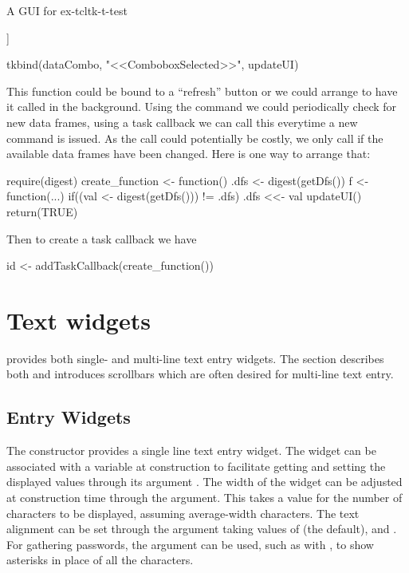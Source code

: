 \begin{example}{A GUI for }{ex-tcltk-t-test}
\begin{Schunk}
\begin{Soutput}
[[4]]
\end{Soutput}
\begin{Sinput}
 tkbind(dataCombo, "<<ComboboxSelected>>", updateUI)
\end{Sinput}
\end{Schunk}

This function could be bound to a ``refresh'' button or we could
arrange to have it called in the background. Using the 
command we could periodically check for new data frames, using a task
callback we can call this everytime a new command is issued.  As the
call could potentially be costly, we only call if the available data
frames have been changed. Here is one way to arrange that:
\begin{Schunk}
\begin{Sinput}
 require(digest)
 create_function <- function() {
   .dfs <- digest(getDfs())
   f <- function(...) {
     if((val <- digest(getDfs())) != .dfs) {
       .dfs <<- val
       updateUI()
     }
     return(TRUE)
   }
 }
\end{Sinput}
\end{Schunk}
Then to create a task callback we have
\begin{Schunk}
\begin{Sinput}
 id <- addTaskCallback(create_function())
\end{Sinput}
\end{Schunk}


\end{example}


\section{Text widgets}
\label{sec:tcltk:text-widgets}
\Tk\/ provides both single- and multi-line text entry widgets. The
section describes both and introduces scrollbars which are often
desired for multi-line text entry.

\subsection{Entry Widgets}
\label{sec:tcltk:entry-widgets}

The  constructor provides a single line text
entry widget. The widget can be associated with a \TCL\/ variable at
construction to facilitate getting and setting the displayed values
through its argument . The width of
the widget can be adjusted at construction time through the
 argument. This takes a value for the number
of characters to be displayed, assuming average-width characters.  The
text alignment can be set through the 
argument taking values of  (the default), 
and . For gathering passwords, the argument
 can be used, such as with
\qcode{*}, to show asterisks in place of all the
characters.

